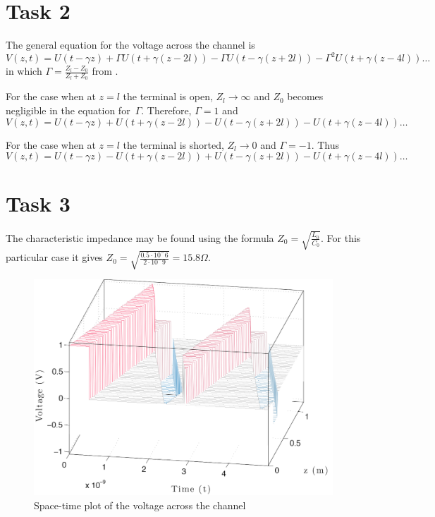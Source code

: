 \documentclass[11pt,titlepage]{report}
\begin{document}
\section{Task 2}
The general equation for the voltage across the channel is 
\begin{equation}
V(z,t)=U(t-\gamma z) + \Gamma U(t+\gamma(z-2l))-\Gamma U(t-\gamma(z+2l))-\Gamma^2U(t+\gamma(z-4l))\dots
\end{equation}
in which $\Gamma=\frac{Z_l-Z_0}{Z_l+Z_0}$ from \cite[64]{epo4-manual}.

For the case when at $z=l$ the terminal is open, $Z_l \to \infty$ and $Z_0$ becomes negligible in the equation for~$\Gamma$. Therefore, $\Gamma=1$ and 
\begin{equation}
V(z,t)=U(t-\gamma z) + U(t+\gamma(z-2l))- U(t-\gamma(z+2l))- U(t+\gamma(z-4l))\dots
\end{equation}

For the case when at $z=l$ the terminal is shorted, $Z_l \to 0$ and $\Gamma=-1$. Thus 
\begin{equation}
V(z,t)=U(t-\gamma z) - U(t+\gamma(z-2l))+U(t-\gamma(z+2l))-U(t+\gamma(z-4l))\dots
\end{equation}


\section{Task 3}
The characteristic impedance may be found using the formula $Z_0=\sqrt{\frac{L_0}{C_0}}$. For this particular case it gives $Z_0=\sqrt{\frac{0.5\cdot10^-6}{2\cdot10^-9}}=15.8\Omega$.

\begin{figure}[H]
	\centering
	\includegraphics[width=.85\linewidth]{resource/voltage-cropped.pdf}
	\caption{Space-time plot of the voltage across the channel}
	\label{fig:ass1-voltage}
\end{figure}
\end{document}
